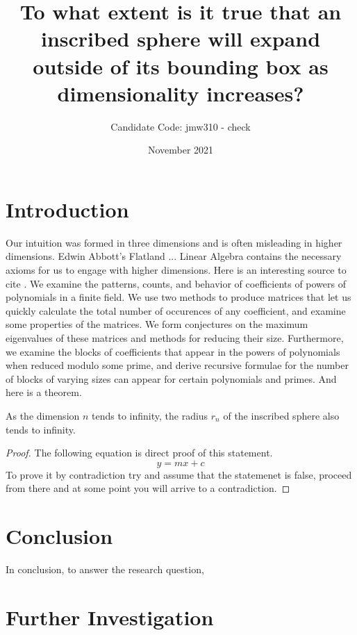 \title{To what extent is it true that an inscribed sphere will expand outside of its bounding box as dimensionality increases?}
\author{Candidate Code: jmw310 - check}
\date{November 2021}



\section{Introduction}
Our intuition was formed in three dimensions and is often misleading in higher dimensions. Edwin Abbott's Flatland ... Linear Algebra contains the necessary axioms for us to engage with higher dimensions. Here is an interesting source to cite \cite{Cipra_1993}.
\researchquestion{}
    We examine the patterns, counts, and behavior of coefficients of
powers of polynomials in a finite field. We use two methods to produce
matrices that let us quickly calculate the total number of occurences
of any coefficient, and examine some properties of the matrices. We
form conjectures on the maximum eigenvalues of these matrices and
methods for reducing their size. Furthermore, we examine the blocks
of coefficients that appear in the powers of polynomials when reduced
modulo some prime, and derive recursive formulae for the number of
blocks of varying sizes can appear for certain polynomials and primes. And here is a theorem.

\begin{theorem}
As the dimension $n$ tends to infinity, the radius $r_n$ of the inscribed sphere also tends to infinity.
\end{theorem}


\begin{proof}
The following equation is direct proof of this statement.
\begin{equation}
y=mx+c
\end{equation}
To prove it by contradiction try and assume that the statemenet is false,
proceed from there and at some point you will arrive to a contradiction. 
\end{proof}


\section{Conclusion}
In conclusion, to answer the research question, 
\researchquestion{}

\section{Further Investigation} 

